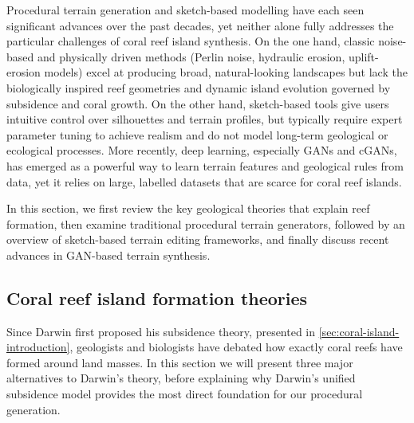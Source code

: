 Procedural terrain generation and sketch-based modelling have each seen significant advances over the past decades, yet neither alone fully addresses the particular challenges of coral reef island synthesis. On the one hand, classic noise-based and physically driven methods (Perlin noise, hydraulic erosion, uplift-erosion models) excel at producing broad, natural-looking landscapes but lack the biologically inspired reef geometries and dynamic island evolution governed by subsidence and coral growth. On the other hand, sketch-based tools give users intuitive control over silhouettes and terrain profiles, but typically require expert parameter tuning to achieve realism and do not model long-term geological or ecological processes. More recently, deep learning, especially GANs and cGANs, has emerged as a powerful way to learn terrain features and geological rules from data, yet it relies on large, labelled datasets that are scarce for coral reef islands. 

In this section, we first review the key geological theories that explain reef formation, then examine traditional procedural terrain generators, followed by an overview of sketch-based terrain editing frameworks, and finally discuss recent advances in GAN-based terrain synthesis.

\subsection{Coral reef island formation theories}
\label{sec:coral-island-sota-coral-theories}

Since Darwin first proposed his subsidence theory, presented in \cref{sec:coral-island-introduction}, geologists and biologists have debated how exactly coral reefs have formed around land masses. In this section we will present three major alternatives to Darwin's theory, before explaining why Darwin's unified subsidence model provides the most direct foundation for our procedural generation.

